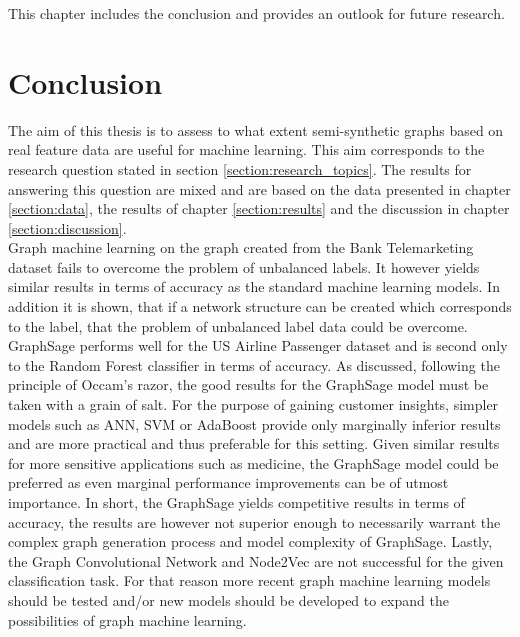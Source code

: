 
  This chapter includes the conclusion and provides an outlook for future
  research.

  \section{Conclusion}
  \label{section:conclusion}

  The aim of this thesis is to assess to what extent semi-synthetic graphs based 
  on real feature data are useful for machine learning. This aim corresponds to
  the research question stated in section \ref{section:research_topics}. The
  results for answering this question are mixed and are based on the data
  presented in chapter \ref{section:data}, the results of chapter
  \ref{section:results} and the discussion in chapter \ref{section:discussion}.
  \\

  \noindent Graph machine learning on the graph created from the Bank 
  Telemarketing dataset fails to overcome the problem of unbalanced labels. It 
  however yields similar results in terms of accuracy as the standard machine 
  learning models. In addition it is shown, that if a network structure can be 
  created which corresponds to the label, that the problem of unbalanced label 
  data could be overcome. \\

  \noindent GraphSage performs well for the US Airline Passenger dataset and
  is second only to the Random Forest classifier in terms of accuracy. As
  discussed, following the principle of Occam's razor, the good results for the
  GraphSage model must be taken with a grain of salt. For the purpose of
  gaining customer insights, simpler models such as ANN, SVM or AdaBoost provide
  only marginally inferior results and are more practical and thus preferable
  for this setting. Given similar results for more sensitive applications such
  as medicine, the GraphSage model could be preferred as even marginal
  performance improvements can be of utmost importance. In short, the GraphSage
  yields competitive results in terms of accuracy, the results are however not
  superior enough to necessarily warrant the complex graph generation process
  and model complexity of GraphSage. Lastly, the Graph Convolutional Network and
  Node2Vec are not successful for the given classification task. For that
  reason more recent graph machine learning models should be tested and/or new 
  models should be developed to expand the possibilities of graph machine 
  learning.\\

